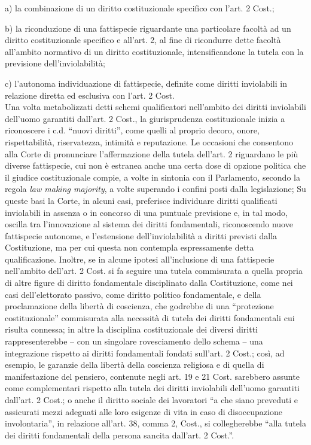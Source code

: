 a) la combinazione di un diritto costituzionale specifico con l’art. 2 Cost.;

b) la riconduzione di una fattispecie riguardante una particolare facoltà ad un diritto costituzionale specifico e all’art. 2, al fine di ricondurre dette facoltà all’ambito normativo di un diritto costituzionale, intensificandone la tutela con la previsione dell’inviolabilità; 

c) l’autonoma individuazione di fattispecie, definite come diritti inviolabili in relazione diretta ed esclusiva con l’art. 2 Cost.
\\Una volta metabolizzati detti schemi qualificatori nell’ambito dei diritti inviolabili dell’uomo garantiti dall’art. 2 Cost., la giurisprudenza costituzionale inizia a riconoscere i c.d. “nuovi diritti”, come quelli al proprio decoro, onore, rispettabilità, riservatezza, intimità e reputazione.
Le occasioni che consentono alla Corte di pronunciare l’affermazione della tutela dell’art. 2 riguardano le più diverse fattispecie, cui non è estranea anche una certa dose di opzione politica che il giudice costituzionale compie, a volte in sintonia con il Parlamento, secondo la regola \textit{law making majority}, a volte superando i confini posti dalla legislazione; 
Su queste basi la Corte, in alcuni casi, preferisce individuare diritti qualificati inviolabili in assenza o in concorso di una puntuale previsione e, in tal modo, oscilla tra l’innovazione al sistema dei diritti fondamentali, riconoscendo nuove fattispecie autonome, e l’estensione dell’inviolabilità a diritti previsti dalla Costituzione, ma per cui questa non contempla espressamente detta qualificazione. 
Inoltre, se in alcune ipotesi all’inclusione di una fattispecie nell’ambito dell’art. 2 Cost. si fa seguire una tutela commisurata a quella propria di altre figure di diritto fondamentale disciplinato dalla Costituzione, come nei casi dell’elettorato passivo, come diritto politico fondamentale, e della proclamazione della libertà di coscienza, che godrebbe di una “protezione costituzionale” commisurata alla necessità di tutela dei diritti fondamentali cui risulta connessa; in altre la disciplina costituzionale dei diversi diritti rappresenterebbe – con un singolare rovesciamento dello schema – una integrazione rispetto ai diritti fondamentali fondati sull’art. 2 Cost.; così, ad esempio, le garanzie della libertà della coscienza religiosa e di quella di manifestazione del pensiero, contenute negli art. 19 e 21 Cost. sarebbero assunte come complementari rispetto alla tutela dei diritti inviolabili dell’uomo garantiti dall’art. 2 Cost.; o anche il diritto sociale dei lavoratori “a che siano preveduti e assicurati mezzi adeguati alle loro esigenze di vita in caso di disoccupazione involontaria”, in relazione all’art. 38, comma 2, Cost., si collegherebbe “alla tutela dei diritti fondamentali della persona sancita dall’art. 2 Cost.”. 
